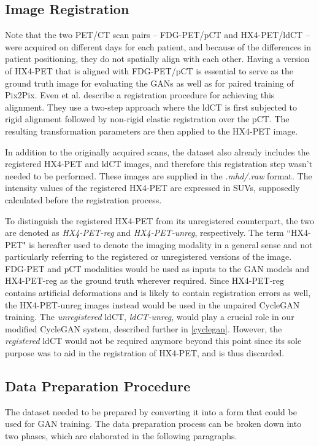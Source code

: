 \subsection{Image Registration}
Note that the two PET/CT scan pairs -- FDG-PET/pCT and HX4-PET/ldCT -- were acquired on different days for each patient, and because of the differences in patient positioning, they do not spatially align with each other. Having a version of HX4-PET that is aligned with FDG-PET/pCT is essential to serve as the ground truth image for evaluating the GANs as well as for paired training of Pix2Pix. Even et al. \cite{even2017predicting} describe a registration procedure for achieving this alignment. They use a two-step approach where the ldCT is first subjected to rigid alignment followed by non-rigid elastic registration over the pCT. The resulting transformation parameters are then applied to the HX4-PET image.

In addition to the originally acquired scans, the dataset also already includes the registered HX4-PET and ldCT images, and therefore this registration step wasn't needed to be performed. These images are supplied in the \textit{.mhd/.raw} format. The intensity values of the registered HX4-PET are expressed in SUVs, supposedly calculated before the registration process. 

To distinguish the registered HX4-PET from its unregistered counterpart, the two are denoted as \textit{HX4-PET-reg} and \textit{HX4-PET-unreg}, respectively. The term ``HX4-PET" is hereafter used to denote the imaging modality in a general sense and not particularly referring to the registered or unregistered versions of the image. FDG-PET and pCT modalities would be used as inputs to the GAN models and HX4-PET-reg as the ground truth wherever required. Since HX4-PET-reg contains artificial deformations and is likely to contain registration errors as well, the HX4-PET-unreg images instead would be used in the unpaired CycleGAN training. The \textit{unregistered} ldCT, \textit{ldCT-unreg}, would play a crucial role in our modified CycleGAN system, described further in \ref{cyclegan}. However, the \textit{registered} ldCT would not be required anymore beyond this point since its sole purpose was to aid in the registration of HX4-PET, and is thus discarded.


\subsection{Data Preparation Procedure}
\label{Data_Processing}
The dataset needed to be prepared by converting it into a form that could be used for GAN training. The data preparation process can be broken down into two phases, which are elaborated in the following paragraphs. 


